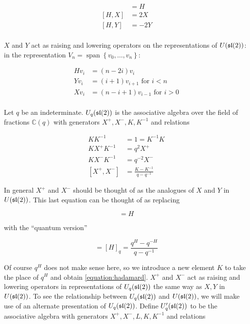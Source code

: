 \begin{align}
[X,Y] & = H \\ 
[H,X] &= 2X \\
[H,Y] &= -2Y \\
\end{align}

$X$ and $Y$ act as raising and lowering operators on the representations of
$U(\mathfrak{sl}(2))$: in the representation $V_n = \operatorname{span}\left\{ v_0,
\ldots, v_n \right\}$:

\begin{align*}
    H v_i &= (n - 2i) v_i \\
    Y v_i &= (i+1)v_{i+1}   \text{ for $i < n$}  \\
    X v_i &= (n-i+1)v_{i-1} \text{ for $i > 0$} \\
\end{align*}

\begin{defn}
\label{Uqsl2Def}
Let $q$ be an indeterminate. $U_q(\mathfrak{sl}(2))$ is the associative algebra over the
field of fractions $\mathbb{C}(q)$ with generators $X^+,X^-,K, K^{-1}$ and
relations 

\begin{align}
    KK^{-1} &= 1 = K^{-1}K \\
    K X^+ K^{-1} &= q^2  X^+  \\
    KX^-K^{-1} &= q^{-2} X^- \\
    [ X^+ ,X^-] &= \frac{K - K^{-1}}{q - q^{-1}} \label{equation:hadamard}
\end{align}
\end{defn}

In general $ X^+ $ and $X^-$ should be thought of as the analogues of $X$ and $Y$
in $U(\mathfrak{sl}(2))$. This last equation can be thought of as replacing 

\begin{equation}
[X,Y] = H
\end{equation}

with the ``quantum version''

\begin{equation}
[X^+,X^-] = [H]_q = \frac{q^H - q^{-H}}{q - q^{-1}}
\end{equation}

Of course $q^H$ does not make sense here, so we introduce a new element $K$ to
take the place of $q^H$ and obtain \ref{equation:hadamard}. $X^+$ and $X^-$ act
as raising and lowering operators in representations of $U_q(\mathfrak{sl}(2))$ the same
way as $X,Y$ in $U(\mathfrak{sl}(2))$. To see the relationship between $U_q(\mathfrak{sl}(2))$
and $U(\mathfrak{sl}(2))$, we will make use of an alternate presentation of
$U_q(\mathfrak{sl}(2))$.  Define $U'_q(\mathfrak{sl}(2))$ to be the associative algebra with
generators $ X^+ ,X^-,L,K,K^{-1}$ and relations


